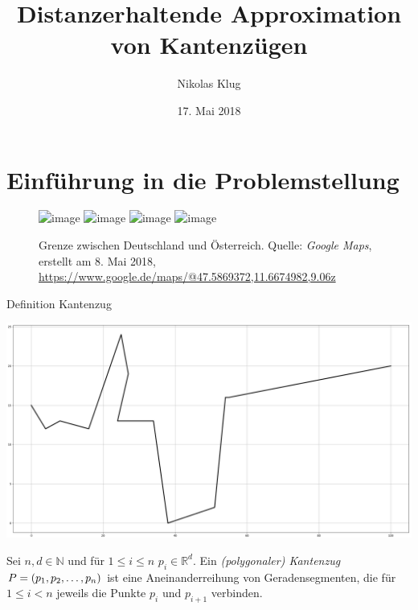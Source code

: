 \documentclass{beamer}
\title[Distanzerhaltende Approximation]{Distanzerhaltende Approximation von Kantenzügen}
\author[N. Klug]{Nikolas Klug}
\institute[Uni Augburg]{Universität Augsburg}
\date{17. Mai 2018}
\begin{document}
	\frame{\titlepage}
	
	\section{Einführung in die Problemstellung}
	\begin{frame}

		\begin{figure}
			\includegraphics<1>[height=0.8\textheight]{maps_zoom1.png}
			\includegraphics<2>[height=0.8\textheight]{maps_zoom2.png}
			\includegraphics<3>[height=0.8\textheight]{maps_zoom3.png}
			\includegraphics<4>[height=0.8\textheight]{maps_zoom4.png}

			\caption{Grenze zwischen Deutschland und Österreich. Quelle: \emph{Google Maps}, erstellt am 8. Mai 2018, \href{https://www.google.de/maps/@47.5869372,11.6674982,9.06z}{https://www.google.de/maps/@47.5869372,11.6674982,9.06z}}
		\end{figure}
		
	\end{frame}
	
	\begin{frame}{Definition Kantenzug}

		\centering
		\includegraphics[height=0.5\textheight]{raw_path.png}
		
		\begin{definition}
			Sei $n, d \in \mathbb{N}$ und für $1 \leq i \leq n$ $p_i \in \mathbb{R}^d$.
			Ein \emph{(polygonaler) Kantenzug} $P = (p_1, p_2, \mathellipsis, p_n)$ ist eine Aneinanderreihung von Geradensegmenten, die für $1 \leq i < n$ jeweils die Punkte $p_i$ und $p_{i+1}$ verbinden. 

		\end{definition}
	\end{frame}
	
\end{document}
